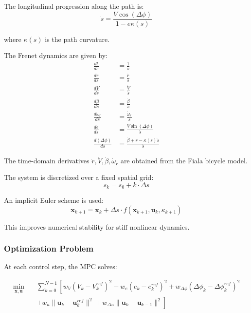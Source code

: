 \documentclass{article}
\begin{document}
The longitudinal progression along the path is:
\begin{equation}
\dot{s} = \frac{V \cos(\Delta \phi)}{1 - e \kappa(s)}
\end{equation}

where $\kappa(s)$ is the path curvature.

The Frenet dynamics are given by:
\begin{align}
\frac{dt}{ds} &= \frac{1}{\dot{s}} \\
\frac{dr}{ds} &= \frac{\dot{r}}{\dot{s}} \\
\frac{dV}{ds} &= \frac{\dot{V}}{\dot{s}} \\
\frac{d\beta}{ds} &= \frac{\dot{\beta}}{\dot{s}} \\
\frac{d\omega_r}{ds} &= \frac{\dot{\omega}_r}{\dot{s}} \\
\frac{de}{ds} &= \frac{V \sin(\Delta \phi)}{\dot{s}} \\
\frac{d(\Delta \phi)}{ds} &= \frac{\dot{\beta} + r - \kappa(s)\dot{s}}{\dot{s}}
\end{align}

The time-domain derivatives $\dot{r}, \dot{V}, \dot{\beta}, \dot{\omega}_r$ are obtained from the Fiala bicycle model.

The system is discretized over a fixed spatial grid:
\begin{equation}
s_k = s_0 + k \cdot \Delta s
\end{equation}

An implicit Euler scheme is used:
\begin{equation}
\mathbf{x}_{k+1} = \mathbf{x}_k + \Delta s \cdot f(\mathbf{x}_{k+1}, \mathbf{u}_k, \kappa_{k+1})
\end{equation}

This improves numerical stability for stiff nonlinear dynamics.

\subsubsection*{Optimization Problem}

At each control step, the MPC solves:

\begin{align}
\min_{\mathbf{x}, \mathbf{u}} \quad &
\sum_{k=0}^{N-1} \left[
w_V (V_k - V_k^{ref})^2
+ w_e (e_k - e_k^{ref})^2
+ w_{\Delta\phi} (\Delta\phi_k - \Delta\phi_k^{ref})^2
\right. \nonumber \\
& \left.
+ w_u \|\mathbf{u}_k - \mathbf{u}_k^{ref}\|^2
+ w_{\Delta u} \|\mathbf{u}_k - \mathbf{u}_{k-1}\|^2
\right]
\end{align}
\end{document}
